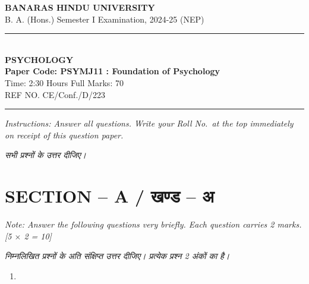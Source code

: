 \documentclass[11pt,a4paper]{article}
\newcommand{\pts}[1]{\hfill \textit{[#1]}}
\begin{document}
\begin{center}
  {\large\bfseries BANARAS HINDU UNIVERSITY}\\[2pt]
  {\normalsize B. A. (Hons.) Semester I Examination, 2024-25 (NEP)}\\[6pt]
  \rule{0.8\linewidth}{0.5pt}\\[6pt]
  {\large\bfseries PSYCHOLOGY}\\[4pt]
  {\large\bfseries Paper Code: PSYMJ11 : Foundation of Psychology}\\[4pt]
  {\normalsize Time: 2:30 Hours \hfill Full Marks: 70}\\[2pt]
  {\small REF NO. CE/Conf./D/223}
\end{center}
\rule{\linewidth}{0.4pt}
\smallskip

\noindent \textit{Instructions: Answer all questions. Write your Roll No.\ at the top immediately on receipt of this question paper.}

\smallskip
\noindent \textit{सभी प्रश्नों के उत्तर दीजिए।}

\bigskip

\section*{SECTION -- A / खण्ड -- अ}
\noindent \textit{Note: Answer the following questions very briefly. Each question carries 2 marks.}\pts{5 $\times$ 2 = 10}

\noindent \textit{निम्नलिखित प्रश्नों के अति संक्षिप्त उत्तर दीजिए। प्रत्येक प्रश्न 2 अंकों का है।}

\begin{enumerate}[label=\textbf{\arabic*.},leftmargin=*,itemsep=8pt]
  \item 
\end{enumerate}
\end{document}
